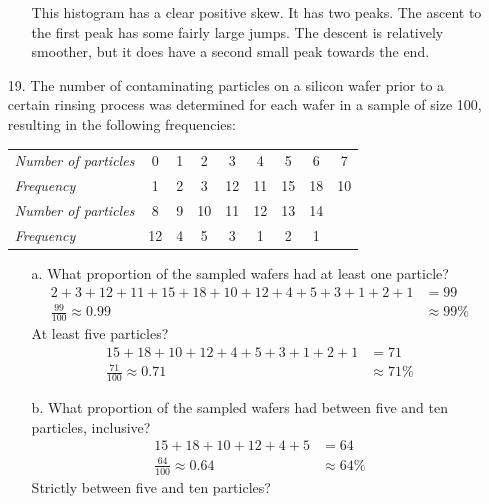 \documentclass[letterpaper,12pt]{article}
\begin{document}
\begin{enumerate}
\begin{enumerate}
        This histogram has a clear positive skew. It has two peaks. The ascent to the first peak has some fairly large jumps. The descent is relatively smoother, but it does have a second small peak towards the end.
    \end{enumerate}
  \item[19.]
    The number of contaminating particles on a silicon wafer prior to a certain rinsing process was determined for each wafer in a sample of size 100, resulting in the following frequencies:
    \begin{center}
      \begin{tabular}{
        >{\itshape}l
        S[table-format=2.0]
        S[table-format=2.0]
        S[table-format=2.0]
        S[table-format=2.0]
        S[table-format=2.0]
        S[table-format=2.0]
        S[table-format=2.0]
        S[table-format=2.0]
      }
        Number of particles & 0 & 1 & 2 & 3 & 4 & 5 & 6 & 7 \\
        Frequency & 1 & 2 & 3 & 12 & 11 & 15 & 18 & 10 \\
        Number of particles & 8 & 9 & 10 & 11 & 12 & 13 & 14 \\
        Frequency & 12 & 4 & 5 & 3 & 1 & 2 & 1
      \end{tabular}
    \end{center}
    \begin{enumerate}
      \item[a.]
        What proportion of the sampled wafers had at least one particle?
        \begin{align*}
          2 + 3 + 12 + 11 + 15 + 18 + 10 + 12 + 4 + 5 + 3 + 1 + 2 + 1 &= 99 \\
          \frac{99}{100} \approx 0.99 &\approx 99\%
        \end{align*}
        At least five particles?
        \begin{align*}
          15 + 18 + 10 + 12 + 4 + 5 + 3 + 1 + 2 + 1 &= 71 \\
          \frac{71}{100} \approx 0.71 &\approx 71\%
        \end{align*}
      \item[b.]
        What proportion of the sampled wafers had between five and ten particles, inclusive?
        \begin{align*}
          15 + 18 + 10 + 12 + 4 + 5 &= 64 \\
          \frac{64}{100} \approx 0.64 &\approx 64\%
        \end{align*}
        Strictly between five and ten particles?

\end{enumerate}
\end{enumerate}
\end{document}
